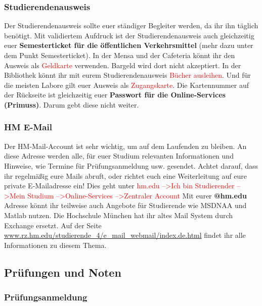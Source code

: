 \subsubsection{Studierendenausweis}

Der Studierendenausweis sollte euer ständiger Begleiter werden, da ihr ihn täglich benötigt. Mit validiertem Aufdruck ist der Studierendenausweis auch gleichzeitig euer \textbf{Semesterticket für die öffentlichen Verkehrsmittel} (mehr dazu unter dem Punkt \glqq Semesterticket\grqq{}). In der Mensa und der Cafeteria könnt ihr den Ausweis als \textcolor{red}{Geldkarte} verwenden. Bargeld wird dort nicht akzeptiert. In der Bibliothek könnt ihr mit eurem Studierendenausweis \textcolor{red}{Bücher ausleihen}. Und für die meisten Labore gilt euer Ausweis als \textcolor{red}{Zugangskarte}. Die Kartennummer auf der Rückseite ist gleichzeitig euer \textbf{Passwort für die Online-Services (Primuss)}. Darum gebt diese nicht weiter.

\subsubsection{HM E-Mail}

Der HM-Mail-Account ist sehr wichtig, um auf dem Laufenden zu bleiben. An diese Adresse werden alle, für euer Studium relevanten Informationen und Hinweise, wie Termine für Prüfungsanmeldung usw. gesendet. Achtet darauf, dass ihr regelmäßig eure Mails abruft, oder richtet euch eine Weiterleitung auf eure private E-Mailadresse ein!\doublebreak
Dies geht unter \textcolor{red}{hm.edu --\textgreater Ich bin Studierender --\textgreater Mein Studium --\textgreater Online-Services --\textgreater Zentraler Account}\doublebreak
Mit eurer  \textbf{@hm.edu}  Adresse könnt ihr teilweise auch Angebote für Studierende wie MSDNAA und Matlab nutzen.\doublebreak
Die Hochschule München hat ihr altes Mail System durch Exchange ersetzt. Auf der Seite \url{www.rz.hm.edu/studierende_4/e_mail_webmail/index.de.html} findet ihr alle Informationen zu diesem Thema.

\subsection{Prüfungen und Noten}
\subsubsection{Prüfungsanmeldung}

